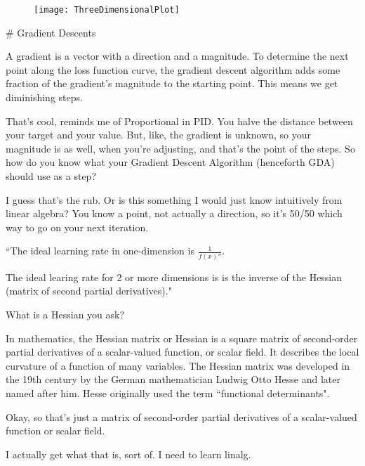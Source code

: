 \begin{markdown}
\begin{figure}[h]
    \texttt{[image: ThreeDimensionalPlot]}
    \centering
\end{figure}

# Gradient Descents

A gradient is a vector with a direction and a magnitude. To determine the next
point along the loss function curve, the gradient descent algorithm adds some
fraction of the gradient's magnitude to the starting point. This means we get
diminishing steps.

That's cool, reminds me of Proportional in PID. You halve the distance between
your target and your value. But, like, the gradient is unknown, so your
magnitude is as well, when you're adjusting, and that's the point of the steps.
So how do you know what your Gradient Descent Algorithm (henceforth GDA) should
use as a step?

I guess that's the rub. Or is this something I would just know intuitively from
linear algebra? You know a point, not actually a direction, so it's 50/50 which
way to go on your next iteration.

``The ideal learning rate in one-dimension is $\frac{1}{f(x)''}$.

The ideal learing rate for 2 or more dimensions is is the inverse of the Hessian
(matrix of second partial derivatives)."

What is a Hessian you ask?

\begin{definition}
    In mathematics, the Hessian matrix or Hessian is a square matrix of
    second-order partial derivatives of a scalar-valued function, or scalar
    field. It describes the local curvature of a function of many variables. The
    Hessian matrix was developed in the 19th century by the German mathematician
    Ludwig Otto Hesse and later named after him. Hesse originally used the term
    ``functional determinants".
\end{definition}

Okay, so that's just a matrix of second-order partial derivatives of a
scalar-valued function or scalar field.

I actually get what that is, sort of. I need to learn linalg.

\end{markdown}


